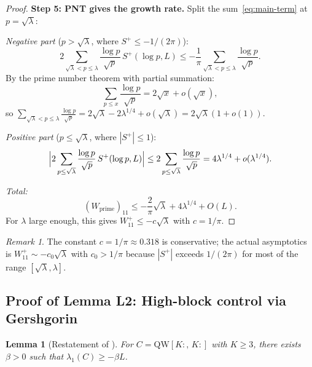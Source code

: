 \documentclass[12pt,a4paper]{article}
\newtheorem{lemma}[theorem]{Lemma}
\theoremstyle{definition}
\theoremstyle{remark}
\newtheorem{remark}[theorem]{Remark}
\begin{document}
\begin{proof}
\medskip\noindent\textbf{Step 5: PNT gives the growth rate.}
Split the sum~\eqref{eq:main-term} at $p = \sqrt{\lambda}$:

\emph{Negative part} ($p > \sqrt{\lambda}$, where $S^+ \leq -1/(2\pi)$):
\[
  2\sum_{\sqrt{\lambda} < p \leq \lambda}\frac{\log p}{\sqrt{p}}\,S^+(\log p, L)
  \leq -\frac{1}{\pi}\sum_{\sqrt{\lambda} < p \leq \lambda}\frac{\log p}{\sqrt{p}}.
\]
By the prime number theorem with partial summation:
\[
  \sum_{p \leq x}\frac{\log p}{\sqrt{p}} = 2\sqrt{x} + o(\sqrt{x}),
\]
so $\displaystyle\sum_{\sqrt{\lambda} < p \leq \lambda}\frac{\log p}{\sqrt{p}} = 2\sqrt{\lambda} - 2\lambda^{1/4} + o(\sqrt{\lambda}) = 2\sqrt{\lambda}(1 + o(1))$.

\emph{Positive part} ($p \leq \sqrt{\lambda}$, where $|S^+| \leq 1$):
\[
  \Bigl|2\sum_{p \leq \sqrt{\lambda}}\frac{\log p}{\sqrt{p}}\,S^+(\log p, L)\Bigr|
  \leq 2\sum_{p \leq \sqrt{\lambda}}\frac{\log p}{\sqrt{p}} = 4\lambda^{1/4} + o(\lambda^{1/4}).
\]

\emph{Total:}
\[
  (W_{\mathrm{prime}})_{11} \leq -\frac{2}{\pi}\sqrt{\lambda} + 4\lambda^{1/4} + O(L).
\]
For $\lambda$ large enough, this gives $W_{11}^+ \leq -c\sqrt{\lambda}$ with $c = 1/\pi$.
\end{proof}

\begin{remark}
The constant $c = 1/\pi \approx 0.318$ is conservative; the actual asymptotics is $W_{11}^+ \sim -c_0\sqrt{\lambda}$ with $c_0 > 1/\pi$ because $|S^+|$ exceeds $1/(2\pi)$ for most of the range $[\sqrt{\lambda}, \lambda]$.
\end{remark}

\subsection{Proof of Lemma L2: High-block control via Gershgorin}

\begin{lemma}[Restatement of ]
For $C = \mathrm{QW}[K{:},\,K{:}]$ with $K \geq 3$, there exists $\beta > 0$ such that $\lambda_1(C) \geq -\beta L$.
\end{lemma}
\end{document}
